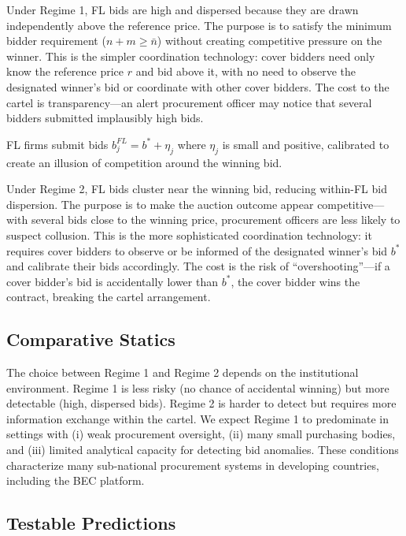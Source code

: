 Under Regime 1, FL bids are high and dispersed because they are drawn independently above the reference price. The purpose is to satisfy the minimum bidder requirement ($n + m \geq \bar{n}$) without creating competitive pressure on the winner. This is the simpler coordination technology: cover bidders need only know the reference price $r$ and bid above it, with no need to observe the designated winner's bid or coordinate with other cover bidders. The cost to the cartel is transparency---an alert procurement officer may notice that several bidders submitted implausibly high bids.

\begin{proposition}
FL firms submit bids $b_j^{FL} = b^* + \eta_j$ where $\eta_j$ is small and positive, calibrated to create an illusion of competition around the winning bid.
\end{proposition}

Under Regime 2, FL bids cluster near the winning bid, reducing within-FL bid dispersion. The purpose is to make the auction outcome appear competitive---with several bids close to the winning price, procurement officers are less likely to suspect collusion. This is the more sophisticated coordination technology: it requires cover bidders to observe or be informed of the designated winner's bid $b^*$ and calibrate their bids accordingly. The cost is the risk of ``overshooting''---if a cover bidder's bid is accidentally lower than $b^*$, the cover bidder wins the contract, breaking the cartel arrangement.

\subsection{Comparative Statics}

The choice between Regime 1 and Regime 2 depends on the institutional environment. Regime 1 is less risky (no chance of accidental winning) but more detectable (high, dispersed bids). Regime 2 is harder to detect but requires more information exchange within the cartel. We expect Regime 1 to predominate in settings with (i) weak procurement oversight, (ii) many small purchasing bodies, and (iii) limited analytical capacity for detecting bid anomalies. These conditions characterize many sub-national procurement systems in developing countries, including the BEC platform.

\subsection{Testable Predictions}

